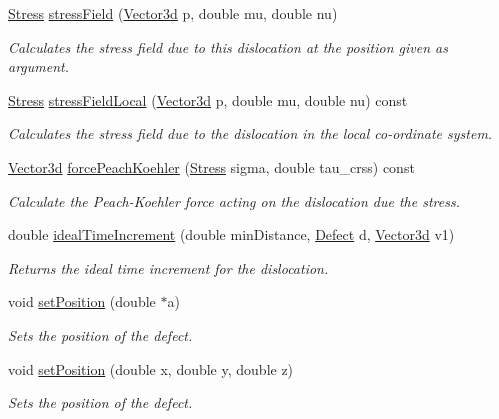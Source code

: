 \begin{DoxyCompactItemize}
\hyperlink{classStress}{Stress} \hyperlink{classDislocation_af61cedf5305080ce0f55eb7177efe529}{stress\-Field} (\hyperlink{classVector3d}{Vector3d} p, double mu, double nu)
\begin{DoxyCompactList}\small\item\em Calculates the stress field due to this dislocation at the position given as argument. \end{DoxyCompactList}\item 
\hyperlink{classStress}{Stress} \hyperlink{classDislocation_a26f938bfb630c3ba1b13522d7a422b8c}{stress\-Field\-Local} (\hyperlink{classVector3d}{Vector3d} p, double mu, double nu) const 
\begin{DoxyCompactList}\small\item\em Calculates the stress field due to the dislocation in the local co-\/ordinate system. \end{DoxyCompactList}\item 
\hyperlink{classVector3d}{Vector3d} \hyperlink{classDislocation_a9ca3f6fb280edaa1fbf156d75b8f0527}{force\-Peach\-Koehler} (\hyperlink{classStress}{Stress} sigma, double tau\-\_\-crss) const 
\begin{DoxyCompactList}\small\item\em Calculate the Peach-\/\-Koehler force acting on the dislocation due the stress. \end{DoxyCompactList}\item 
double \hyperlink{classDislocation_a6b02065fa97acefac00400182dea8738}{ideal\-Time\-Increment} (double min\-Distance, \hyperlink{classDefect}{Defect} d, \hyperlink{classVector3d}{Vector3d} v1)
\begin{DoxyCompactList}\small\item\em Returns the ideal time increment for the dislocation. \end{DoxyCompactList}\item 
void \hyperlink{classDefect_a2d233d13a8a93f6fba463a1fbc1c6c9f}{set\-Position} (double $\ast$a)
\begin{DoxyCompactList}\small\item\em Sets the position of the defect. \end{DoxyCompactList}\item 
void \hyperlink{classDefect_ad1a6acd8399d2ecabb7ce2b77623bbec}{set\-Position} (double x, double y, double z)
\begin{DoxyCompactList}\small\item\em Sets the position of the defect. \end{DoxyCompactList}\item 

\end{DoxyCompactItemize}

